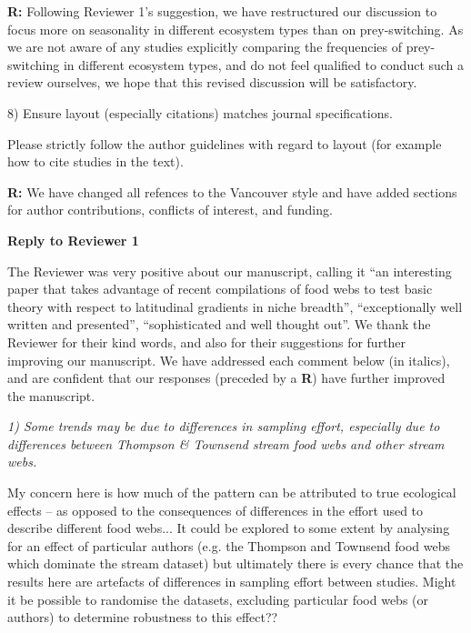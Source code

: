 \documentclass[12pt]{letter}
\newenvironment{refquote}{\bigskip \begin{it}}{\end{it}\smallskip}
\begin{document}
  \textbf{R:} Following Reviewer 1's suggestion, we have 
    restructured our discussion
    to focus more on seasonality in different ecosystem types than on prey-switching.
    As we are not aware of any studies explicitly comparing the frequencies of 
    prey-switching in different ecosystem types, and do not feel qualified to conduct
    such a review ourselves, we hope that this revised discussion will be satisfactory.


  8) Ensure layout (especially citations) matches journal specifications.

  \begin{refquote}

    Please strictly follow the author guidelines with regard to layout (for
    example how to cite studies in the text).

  \end{refquote}

  \textbf{R:} We have changed all refences to the Vancouver style and have 
    added sections for author contributions, conflicts of interest, and funding.

  \newpage

{\Large \bf Reply to Reviewer 1}

  The Reviewer was very positive about our manuscript, calling it
  ``an interesting paper that takes advantage of recent compilations
  of food webs to test basic theory with respect to latitudinal gradients in
  niche breadth'', ``exceptionally well written and presented'', ``sophisticated
  and well thought out''. We thank the Reviewer for their kind words,
  and also for their suggestions for further improving our manuscript. We
  have addressed each comment below (in italics), and are confident that our
  responses (preceded by a \textbf{R}) have further improved the manuscript.
  

  \emph{
  1) Some trends may be due to differences in sampling effort, especially
  due to differences between Thompson \& Townsend stream food webs and other
  stream webs.}


  \begin{refquote}

    My concern here is how much of the pattern can be attributed to true
    ecological effects – as opposed to the consequences of differences in the
    effort used to describe different food webs... It could be explored to some extent by
    analysing for an effect of particular authors (e.g. the Thompson and
    Townsend food webs which dominate the stream dataset) but ultimately there
    is every chance that the results here are artefacts of differences in
    sampling effort between studies. Might it be possible to randomise the
    datasets, excluding particular food webs (or authors) to determine
    robustness to this effect?? 

  \end{refquote}
\end{document}
